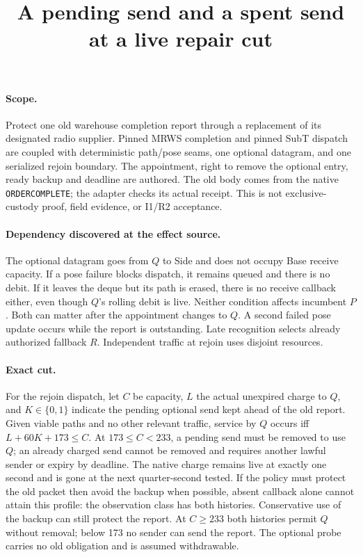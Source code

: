 \documentclass[11pt]{article}
\title{A pending send and a spent send at a live repair cut}
\author{}
\date{}
\begin{document}
\maketitle
\paragraph{Scope.}
Protect one old warehouse completion report through a replacement of its
designated radio supplier. Pinned MRWS completion and pinned SubT dispatch
are coupled with deterministic path/pose seams, one optional datagram, and
one serialized rejoin boundary. The appointment, right to remove the
optional entry, ready backup and deadline are authored. The old body
comes from the native \texttt{ORDERCOMPLETE}; the adapter checks its
actual receipt. This is not exclusive-custody proof, field evidence,
or I1/R2 acceptance.

\paragraph{Dependency discovered at the effect source.}
The optional datagram goes from \(Q\) to Side and does not occupy Base
receive capacity. If a pose failure blocks dispatch, it remains queued and
there is no debit. If it leaves the deque but its path is erased, there is
no receive callback either, even though \(Q\)'s rolling debit is live.
Neither condition affects incumbent \(P\). Both can matter after the
appointment changes to \(Q\). A second failed pose update occurs while the
report is outstanding. Late recognition selects already authorized
fallback \(R\). Independent traffic at rejoin uses disjoint resources.

\paragraph{Exact cut.}
For the rejoin dispatch, let \(C\) be capacity, \(L\) the actual unexpired
charge to \(Q\), and \(K\in\{0,1\}\) indicate the pending optional send
kept ahead of the old report. Given viable paths and no other relevant
traffic, service by \(Q\) occurs iff \(L+60K+173\le C\).
At \(173\le C<233\), a pending send must be removed to use \(Q\); an already
charged send cannot be removed and requires another lawful sender or expiry
by deadline. The native charge remains live at exactly one second and is
gone at the next quarter-second tested. If the policy must protect the old
packet then avoid the backup when possible, absent callback alone cannot
attain this profile: the observation class has both histories. Conservative
use of the backup can still protect the report. At \(C\ge233\) both histories
permit \(Q\) without removal; below 173 no sender can send the report.
The optional probe carries no old obligation and is assumed withdrawable.
\end{document}
